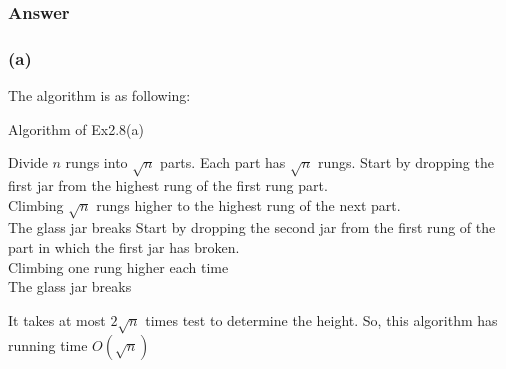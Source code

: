\documentclass[a4paper]{article}
\begin{document}
\subsubsection*{Answer}
\subsubsection*{(a)}
The algorithm is as following:
\begin{algorithm}[!htb]
	\caption{Algorithm of Ex2.8(a)}
	\begin{algorithmic}[1]
		\State Divide $n$ rungs into $\sqrt{n}$ parts. Each part has $\sqrt{n}$ rungs.
		\State Start by dropping the first jar from the highest rung of the first rung part.
		\Repeat \\
		\quad Climbing $\sqrt{n}$ rungs higher to the highest rung of the next part.
		\Until \\
		\quad The glass jar breaks
		\State Start by dropping the second jar from the first rung of the  part in which the first jar has broken.
		\Repeat \\
		\quad Climbing one rung higher each time
		\Until\\
		\quad The glass jar breaks\\
	\end{algorithmic}
\end{algorithm}
\par It takes at most $2\sqrt{n}$ times test to determine the height. So, this algorithm has running time $O(\sqrt{n})$
\vspace{1cm}
\end{document}
